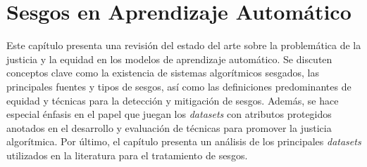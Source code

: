 \chapter{Sesgos en Aprendizaje Autom\'atico}\label{chapter:state-of-the-art}



Este cap\'itulo presenta una revisi\'on del estado del arte sobre la problem\'atica de la justicia y la equidad en los modelos de 
aprendizaje autom\'atico. Se discuten conceptos clave como la existencia de sistemas algor\'itmicos sesgados, las principales fuentes
y tipos de sesgos, as\'i como las definiciones predominantes de equidad y t\'ecnicas para la detecci\'on y mitigaci\'on de sesgos.
Adem\'as, se hace especial \'enfasis en el papel que juegan los \emph{datasets} con atributos protegidos anotados en el desarrollo
y evaluaci\'on de t\'ecnicas para promover la justicia algor\'itmica. Por \'ultimo, el cap\'itulo presenta un an\'alisis de los 
principales \emph{datasets} utilizados en la literatura para el tratamiento de sesgos.

